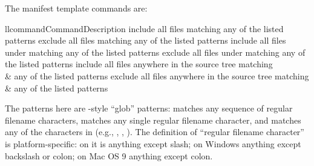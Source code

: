 \documentclass{manual}
\begin{document}

The manifest template commands are:

\begin{tableii}{ll}{command}{Command}{Description}
    {include all files matching any of the listed patterns}
    {exclude all files matching any of the listed patterns}
    {include all files under  matching any of the listed patterns}
    {exclude all files under  matching any of the listed patterns}
    {include all files anywhere in the source tree matching\\&
     any of the listed patterns}
    {exclude all files anywhere in the source tree matching\\&
     any of the listed patterns}
\end{tableii}

The patterns here are \UNIX-style ``glob'' patterns: \code{*} matches any
sequence of regular filename characters,  matches any single
regular filename character, and  matches any of the
characters in  (e.g., , ,
).  The definition of ``regular filename character'' is
platform-specific: on \UNIX{} it is anything except slash; on Windows
anything except backslash or colon; on Mac OS 9 anything except colon.






\end{document}
